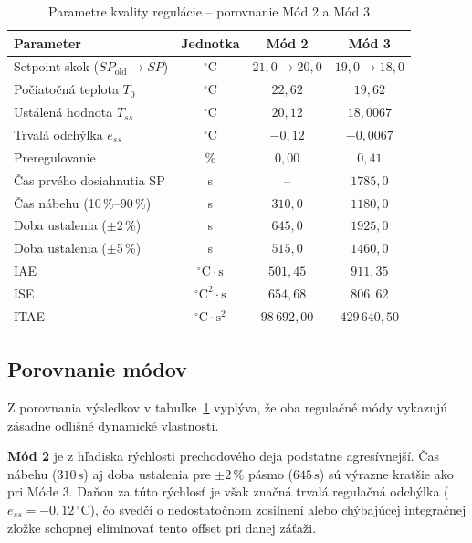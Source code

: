 \begin{table}[H]
\centering
\caption{Parametre kvality regulácie -- porovnanie Mód 2 a Mód 3}
\label{tab:kvalita}
\begin{tabular}{lccc}
\hline
\textbf{Parameter} & \textbf{Jednotka} & \textbf{Mód 2} & \textbf{Mód 3} \\
\hline
Setpoint skok ($SP_\text{old} \rightarrow SP$) & $^\circ\text{C}$ & $21{,}0 \rightarrow 20{,}0$ & $19{,}0 \rightarrow 18{,}0$ \\
Počiatočná teplota $T_0$    & $^\circ\text{C}$   & $22{,}62$    & $19{,}62$    \\
Ustálená hodnota $T_{ss}$   & $^\circ\text{C}$   & $20{,}12$    & $18{,}0067$  \\
Trvalá odchýlka $e_{ss}$    & $^\circ\text{C}$   & $-0{,}12$    & $-0{,}0067$  \\
Preregulovanie              & \%                 & $0{,}00$     & $0{,}41$     \\
Čas prvého dosiahnutia SP   & s                  & --           & $1785{,}0$   \\
Čas nábehu (10\,\%--90\,\%) & s                  & $310{,}0$    & $1180{,}0$   \\
Doba ustalenia ($\pm$2\,\%) & s                  & $645{,}0$    & $1925{,}0$   \\
Doba ustalenia ($\pm$5\,\%) & s                  & $515{,}0$    & $1460{,}0$   \\
IAE                         & $^\circ\text{C}\cdot\text{s}$       & $501{,}45$       & $911{,}35$       \\
ISE                         & $^\circ\text{C}^2\cdot\text{s}$     & $654{,}68$       & $806{,}62$       \\
ITAE                        & $^\circ\text{C}\cdot\text{s}^2$     & $98\,692{,}00$   & $429\,640{,}50$  \\
\hline
\end{tabular}
\end{table}

\subsection{Porovnanie módov}

Z porovnania výsledkov v tabuľke~\ref{tab:kvalita} vyplýva, že oba regulačné módy vykazujú zásadne odlišné dynamické vlastnosti.

\textbf{Mód 2} je z hľadiska rýchlosti prechodového deja podstatne agresívnejší. Čas nábehu ($310\,\text{s}$) aj doba ustalenia pre $\pm2\,\%$ pásmo ($645\,\text{s}$) sú výrazne kratšie ako pri Móde 3. Daňou za túto rýchlosť je však značná trvalá regulačná odchýlka ($e_{ss} = -0{,}12\,^\circ\text{C}$), čo svedčí o nedostatočnom zosilnení alebo chýbajúcej integračnej zložke schopnej eliminovať tento offset pri danej záťaži.

